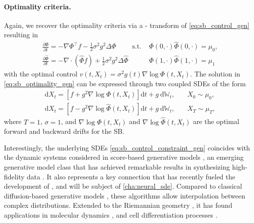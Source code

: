 \paragraph{Optimality criteria.}
Again, we recover the optimality criteria via a \citeauthor{hopf1950partial}-\citeauthor{cole1951quasi} transform  of \eqref{eq:sb_control_gen} resulting in
\begin{align} \label{eq:sb_optimality_gen}
& \frac{\partial \Phi}{\partial t}=-\nabla \Phi^{\top} f- \frac{1}{2}\sigma^2 g^2 \Delta \Phi \quad \quad \text { s.t. } &\Phi(0, \cdot) \widehat{\Phi}(0,  \cdot)=\mu_0, \\
\nonumber & \frac{\partial \widehat{\Phi}}{\partial t}=-\nabla \cdot(\widehat{\Phi} f)+\frac{1}{2}\sigma^2 g^2 \Delta \widehat{\Phi} \quad &  \Phi(1, \cdot) \widehat{\Phi}(1, \cdot)=\mu_1
\end{align}
with the optimal control $v(t, X_t)= \sigma^2 g(t) \nabla \log \Phi\left(t, X_t\right)$.
The solution in \eqref{eq:sb_optimality_gen} can be expressed through two coupled SDEs of the form \citep{leonard2013survey}
\begin{align}
\label{eq:sb_forward} 
& \mathrm{d} X_t=\left[f+g^2 \nabla \log \Phi\left(t, X_t\right)\right] \mathrm{d} t+g \mathrm{~d} \mathbb{W}_t, \quad & X_0 \sim \mu_0, \\
\label{eq:sb_backward}
& \mathrm{d} X_t=\left[f-g^2 \nabla \log \widehat{\Phi}\left(t, X_t\right)\right] \mathrm{d} t+g \mathrm{~d} \mathbb{W}_t, \quad & X_T \sim \mu_T,
\end{align}
where $T = 1$, $\sigma = 1$, and $\nabla \log \Phi\left(t, X_t\right)$ and $\nabla \log \widehat{\Phi}\left(t, X_t\right)$ are the optimal forward and backward drifts for the \acrlong{SB}.

 Interestingly, the underlying SDEs  \eqref{eq:sb_control_constraint_gen} coincides with the dynamic systems considered in score-based generative models \citep{song2020score}, an emerging generative model class that has achieved remarkable results in synthesizing high-fidelity data \citep{song2019generative, kong2020diffwave}.
It also represents a key connection that has recently fueled the development of  \citep{de2021diffusion, chen2021stochastic, bunne2022recovering, liu2022deep}, and will be subject of \cref{cha:neural_sde}.
Compared to classical diffusion-based generative models \citep{daniels2021score, song2020score}, these algorithms allow interpolation between complex distributions. Extended to the Riemannian geometry \citep{thornton2022riemannian, de2022riemannian}, it has found applications in molecular dynamics \citep{holdijk2022path, somnath2023aligned}, and cell differentiation processes \citep{vargas2021solving, bunne2022recovering, tong2023conditional}.
